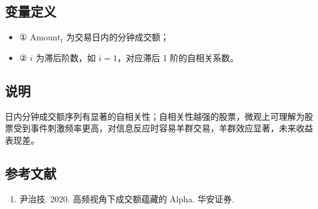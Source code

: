 \documentclass{article}
\begin{document}
\subsection{变量定义}
\begin{itemize}
    \item ① \( \mathrm{Amount}_t \) 为交易日内的分钟成交额；
    \item ② \( i \) 为滞后阶数，如 \( i=1 \)，对应滞后 1 阶的自相关系数。
\end{itemize}

\subsection{说明}
日内分钟成交额序列有显著的自相关性；自相关性越强的股票，微观上可理解为股票受到事件刺激频率更高，对信息反应时容易羊群交易，羊群效应显著，未来收益表现差。

\subsection{参考文献}
\begin{enumerate}
    \item 尹治技. 2020. 高频视角下成交额蕴藏的 Alpha. 华安证券.
\end{enumerate}
\end{document}
